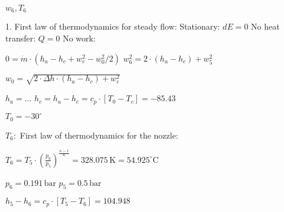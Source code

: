 \( w_6, T_6 \)  

1. First law of thermodynamics for steady flow:  
Stationary: \( dE = 0 \)  
No heat transfer: \( Q = 0 \)  
No work:  

\( 0 = \dot{m} \cdot (h_a - h_c + w_e^2 - w_0^2 / 2) \)  
\( w_6^2 = 2 \cdot (h_a - h_c) + w_5^2 \)  

\( w_0 = \sqrt{2 \cdot \Delta h \cdot (h_a - h_c) + w_e^2} \)  

\( h_a = \dots \)  
\( h_c = h_a - h_c = c_p \cdot [T_0 - T_c] = -85.43 \)  

\( T_0 = -30^\circ \)  

\( T_6: \)  
First law of thermodynamics for the nozzle:  

\( T_6 = T_5 \cdot \left( \frac{p_6}{p_5} \right)^{\frac{\kappa - 1}{\kappa}} = 328.075 \, \text{K} = 54.925^\circ \text{C} \)  

\( p_6 = 0.191 \, \text{bar} \)  
\( p_5 = 0.5 \, \text{bar} \)  

\( h_5 - h_6 = c_p \cdot [T_5 - T_6] = 104.948 \)